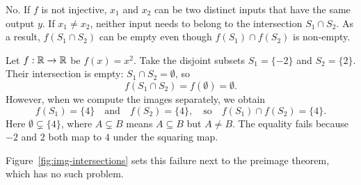 No. If $f$ is not injective, $x_1$ and $x_2$ can be two distinct inputs that have the same output $y$. If $x_1 \neq x_2$, neither input needs to belong to the intersection $S_1 \cap S_2$. As a result, $f(S_1 \cap S_2)$ can be empty even though $f(S_1) \cap f(S_2)$ is non-empty.

\begin{example}[A Counterexample]
Let $f: \mathbb{R} \to \mathbb{R}$ be $f(x) = x^2$.
Take the disjoint subsets $S_1 = \{-2\}$ and $S_2 = \{2\}$.
Their intersection is empty: $S_1 \cap S_2 = \emptyset$, so
\[
f(S_1 \cap S_2) = f(\emptyset) = \emptyset.
\]
However, when we compute the images separately, we obtain
\[
f(S_1) = \{4\} \quad \text{and} \quad f(S_2) = \{4\}, \quad \text{so} \quad f(S_1) \cap f(S_2) = \{4\}.
\]
Here $\emptyset \subsetneq \{4\}$, where $A \subsetneq B$ means $A \subseteq B$ but $A \neq B$. The equality fails because $-2$ and $2$ both map to $4$ under the squaring map.
\end{example}

Figure~\ref{fig:img-intersections} sets this failure next to the preimage theorem, which has no such problem.

